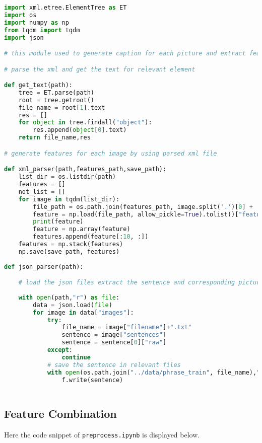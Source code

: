 \begin{lstlisting}[language=Python]
import xml.etree.ElementTree as ET
import os
import numpy as np
from tqdm import tqdm
import json

# this module used to generate caption for each picture and extract features base on the corresponding caption

# parse the xml and get the text for relevant element

def get_text(path):
    tree = ET.parse(path)
    root = tree.getroot()
    file_name = root[1].text
    res = []
    for object in tree.findall("object"):
        res.append(object[0].text)
    return file_name,res

# generate features for each image by using parsed xml file

def xml_parser(path,features_path,save_path):
    list_dir = os.listdir(path)
    features = []
    not_list = []
    for image in tqdm(list_dir):
        file_path = os.path.join(features_path, image.split('.')[0] + '.npy')
        feature = np.load(file_path, allow_pickle=True).tolist()["features"]
        print(feature)
        feature = np.array(feature)
        features.append(feature[:10, :])
    features = np.stack(features)
    np.save(save_path, features)
    
def json_parser(path):

    # load the json files extract the sentence and corresponding picture name.
    
    with open(path,"r") as file:
        data = json.load(file)
        for image in data["images"]:
            try:
                file_name = image["filename"]+".txt"
                sentence = image["sentences"]
                sentence = sentence[0]["raw"]
            except:
                continue
            # save the sentence in relevant files
            with open(os.path.join("../data/phrase_train", file_name),"w") as f:
                f.write(sentence)
                
\end{lstlisting}

\subsection{Feature Combination}
Here the code snippet of \verb|preprocess.ipynb| is displayed below.

